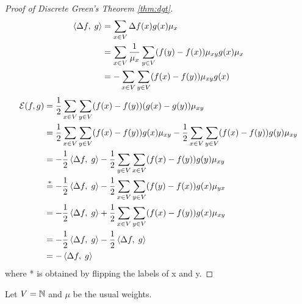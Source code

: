 \documentclass[main]{subfiles}
\begin{document}
\begin{proof}[Proof of Discrete Green's Theorem \eqref{thm:dgt}]
    \begin{align*}
        \left\langle\Delta f,\;g\right\rangle & = \sum_{x \in V} \Delta f(x)g(x)\mu_x                                     \\
                         & = \sum_{x \in V}\frac{1}{\mu_x}\sum_{y \in V}(f(y)-f(x))\mu_{xy}g(x)\mu_x \\
                         & = - \sum_{x \in V}\sum_{y \in V}(f(x)-f(y))\mu_{xy}g(x)
    \end{align*}
    \begin{align*}
        \mathcal{E}(f,g) & = \frac{1}{2} \sum_{x \in V}\sum_{y \in V}(f(x)-f(y))(g(x)-g(y))\mu_{xy}                                                           \\
                         & = \frac{1}{2} \sum_{x \in V}\sum_{y \in V}(f(x)-f(y))g(x)\mu_{xy} - \frac{1}{2}\sum_{x \in V}\sum_{y \in V}(f(x)-f(y))g(y)\mu_{xy} \\
                         & = -\frac{1}{2}\left\langle\Delta f,\;g\right\rangle - \frac{1}{2}\sum_{y \in V}\sum_{x \in V}(f(x)-f(y))g(y)\mu_{xy}                                    \\
                         & \stackrel{*}{=} -\frac{1}{2}\left\langle\Delta f,\;g\right\rangle - \frac{1}{2}\sum_{x \in V}\sum_{y \in V}(f(y)-f(x))g(x)\mu_{yx}                      \\
                         & = -\frac{1}{2}\left\langle\Delta f,\;g\right\rangle + \frac{1}{2}\sum_{x \in V}\sum_{y \in V}(f(x)-f(y))g(x)\mu_{xy}                                    \\
                         & = -\frac{1}{2}\left\langle\Delta f,\;g\right\rangle -\frac{1}{2}\left\langle\Delta f,\;g\right\rangle                                                                        \\
                         & = -\left\langle\Delta f,\;g\right\rangle                                                                                                                \\
    \end{align*}
    where * is obtained by flipping the labels of x and y.
\end{proof}
\ex

Let $V = \mathbb N$ and $\mu$ be the usual weights.
\end{document}
